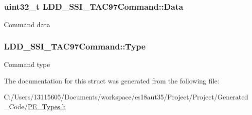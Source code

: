 \subsubsection[{Data}]{\setlength{\rightskip}{0pt plus 5cm}uint32\+\_\+t L\+D\+D\+\_\+\+S\+S\+I\+\_\+\+T\+A\+C97\+Command\+::\+Data}\label{struct_l_d_d___s_s_i___t_a_c97_command_abc16535d09d61f2c3f885adf91632117}
Command data \hypertarget{struct_l_d_d___s_s_i___t_a_c97_command_ac7226beaf57a764f71faf7e822e27a6e}{}
\subsubsection[{Type}]{ L\+D\+D\+\_\+\+S\+S\+I\+\_\+\+T\+A\+C97\+Command\+::\+Type}\label{struct_l_d_d___s_s_i___t_a_c97_command_ac7226beaf57a764f71faf7e822e27a6e}
Command type 

The documentation for this struct was generated from the following file\+:\begin{DoxyCompactItemize}
\item 
C\+:/\+Users/13115605/\+Documents/workspace/es18aut35/\+Project/\+Project/\+Generated\+\_\+\+Code/\hyperlink{_p_e___types_8h}{P\+E\+\_\+\+Types.\+h}\end{DoxyCompactItemize}
